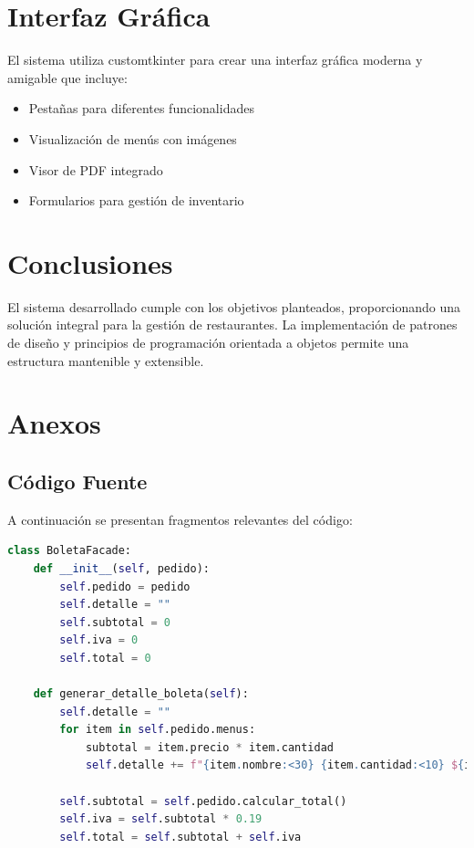\documentclass[12pt,letterpaper]{article}
\begin{document}
\section{Interfaz Gráfica}
El sistema utiliza customtkinter para crear una interfaz gráfica moderna y amigable que incluye:
\begin{itemize}
    \item Pestañas para diferentes funcionalidades
    \item Visualización de menús con imágenes
    \item Visor de PDF integrado
    \item Formularios para gestión de inventario
\end{itemize}

\section{Conclusiones}
El sistema desarrollado cumple con los objetivos planteados, proporcionando una solución integral para la gestión de restaurantes. La implementación de patrones de diseño y principios de programación orientada a objetos permite una estructura mantenible y extensible.

\section{Anexos}
\subsection{Código Fuente}
A continuación se presentan fragmentos relevantes del código:

\begin{lstlisting}[language=Python, caption=Implementación de BoletaFacade]
class BoletaFacade:
    def __init__(self, pedido):
        self.pedido = pedido
        self.detalle = ""
        self.subtotal = 0
        self.iva = 0
        self.total = 0

    def generar_detalle_boleta(self):
        self.detalle = ""
        for item in self.pedido.menus:
            subtotal = item.precio * item.cantidad
            self.detalle += f"{item.nombre:<30} {item.cantidad:<10} ${item.precio:<10.2f} ${subtotal:<10.2f}\n"
        
        self.subtotal = self.pedido.calcular_total()
        self.iva = self.subtotal * 0.19
        self.total = self.subtotal + self.iva
\end{lstlisting}
\end{document}

